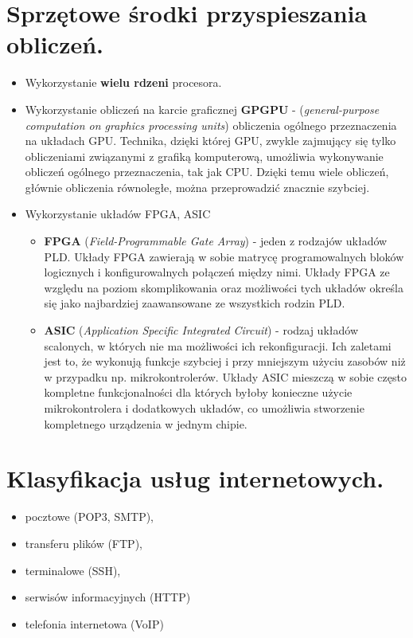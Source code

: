 \documentclass[12pt,a4paper]{article}
\begin{document}
	\section{Sprzętowe środki przyspieszania obliczeń.}
	\begin{itemize}
		\item Wykorzystanie \textbf{wielu rdzeni} procesora.
		\item Wykorzystanie obliczeń na karcie graficznej \textbf{GPGPU} - (\textit{general-purpose computation on graphics processing units}) obliczenia ogólnego przeznaczenia na układach GPU. Technika, dzięki której GPU, zwykle zajmujący się tylko obliczeniami związanymi z grafiką komputerową, umożliwia wykonywanie obliczeń ogólnego przeznaczenia, tak jak CPU. Dzięki temu wiele obliczeń, głównie obliczenia równoległe, można przeprowadzić znacznie szybciej.
		\item Wykorzystanie układów FPGA, ASIC
		\begin{itemize}
			\item \textbf{FPGA} (\textit{Field-Programmable Gate Array}) - jeden z rodzajów układów PLD. Układy FPGA zawierają w sobie matrycę programowalnych bloków logicznych i konfigurowalnych połączeń między nimi. Układy FPGA ze względu na poziom skomplikowania oraz możliwości tych układów określa się jako najbardziej zaawansowane ze wszystkich rodzin PLD.
			\item \textbf{ASIC} (\textit{Application Specific Integrated Circuit}) - rodzaj układów scalonych, w których nie ma możliwości ich rekonfiguracji. Ich zaletami jest to, że wykonują funkcje szybciej i przy mniejszym użyciu zasobów niż w przypadku np. mikrokontrolerów. Układy ASIC mieszczą w sobie często kompletne funkcjonalności dla których byłoby konieczne użycie mikrokontrolera i dodatkowych układów, co umożliwia stworzenie kompletnego urządzenia w jednym chipie.
		\end{itemize}
	\end{itemize}

	\section{Klasyfikacja usług internetowych.}
	\begin{itemize}
		\item pocztowe (POP3, SMTP),
		\item transferu plików (FTP),
		\item terminalowe (SSH),
		\item serwisów informacyjnych (HTTP)
		\item telefonia internetowa (VoIP)
	\end{itemize}
\end{document}
